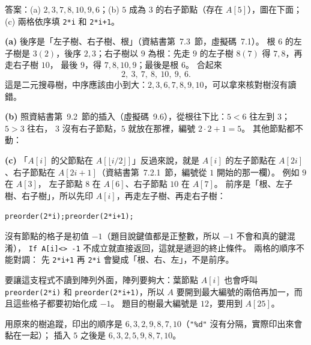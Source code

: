 \begin{pastsoln}
答案：(a) $2, 3, 7, 8, 10, 9, 6$；(b) $5$ 成為 $3$ 的右子節點（存在 $A[5]$），圖在下面；
(c) 兩格依序填 \texttt{2*i} 和 \texttt{2*i+1}。

\textbf{(a)} 後序是「左子樹、右子樹、根」（資結書第~7.3~節，虛擬碼~7.1）。 根 $6$ 的左子樹是
$3(2)$，後序 $2, 3$；右子樹以 $9$ 為根：先走 $9$ 的左子樹 $8(7)$ 得 $7, 8$，再走右子樹 $10$，
最後 $9$，得 $7, 8, 10, 9$；最後是根 $6$。 合起來
\[
2,\ 3,\ 7,\ 8,\ 10,\ 9,\ 6 .
\]
這是二元搜尋樹，中序應該由小到大：$2, 3, 6, 7, 8, 9, 10$，可以拿來核對樹沒有讀錯。

\textbf{(b)} 照資結書第~9.2~節的插入（虛擬碼~9.6），從根往下比：$5 < 6$ 往左到 $3$；$5 > 3$ 往右，
$3$ 沒有右子節點，$5$ 就放在那裡，編號 $2 \cdot 2 + 1 = 5$。 其他節點都不動：
\begin{center}
\end{center}

\textbf{(c)} 「$A[i]$ 的父節點在 $A[\lfloor i/2 \rfloor]$」反過來說，就是 $A[i]$ 的左子節點在
$A[2i]$、右子節點在 $A[2i+1]$（資結書第~7.2.1~節，編號從 $1$ 開始的那一欄）。 例如 $9$ 在 $A[3]$，
左子節點 $8$ 在 $A[6]$、右子節點 $10$ 在 $A[7]$。 前序是「根、左子樹、右子樹」，所以先印
$A[i]$，再走左子樹、再走右子樹：
\begin{center}
\texttt{preorder(2*i);}\qquad \texttt{preorder(2*i+1);}
\end{center}
沒有節點的格子是初值 $-1$（題目說鍵值都是正整數，所以 $-1$ 不會和真的鍵混淆），
\texttt{If A[i]<> -1} 不成立就直接返回，這就是遞迴的終止條件。 兩格的順序不能對調：
先 \texttt{2*i+1} 再 \texttt{2*i} 會變成「根、右、左」，不是前序。

要讓這支程式不讀到陣列外面，陣列要夠大：葉節點 $A[i]$ 也會呼叫 \texttt{preorder(2*i)} 和
\texttt{preorder(2*i+1)}，所以 $A$ 要開到最大編號的兩倍再加一，而且這些格子都要初始化成 $-1$。
題目的樹最大編號是 $12$，要用到 $A[25]$。

用原來的樹追蹤，印出的順序是 $6, 3, 2, 9, 8, 7, 10$（\texttt{"\%d"} 沒有分隔，實際印出來會黏在一起）；
插入 $5$ 之後是 $6, 3, 2, 5, 9, 8, 7, 10$。
\end{pastsoln}
